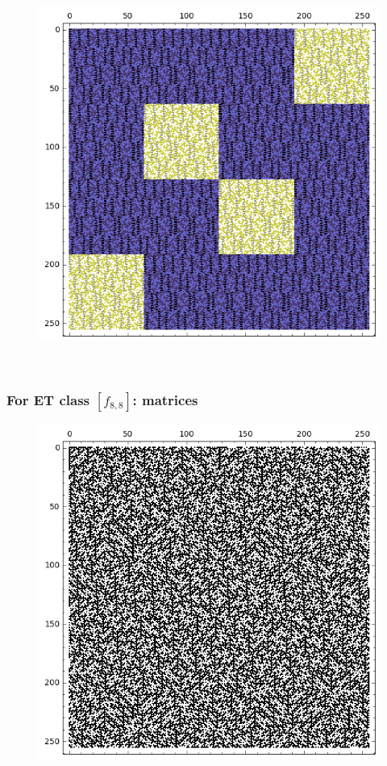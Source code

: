 \documentclass[pdf,sprung,slideColor,nocolorBG]{beamer}
\newenvironment{colortheme}[1]{
\def\ProvidesPackageRCS $##1${\relax}
\renewcommand{\ProcessOptions}{\relax}
\makeatletter

\makeatother
}{}
\begin{document}
\begin{colortheme}{jubata}
\begin{frame}
\begin{figure}
\begin{minipage}{.48\textwidth}
  \label{fig:8_7_weight_class_matrix}
\end{minipage}%
\begin{minipage}{.48\textwidth}
  \centering
  \includegraphics[width=.9\linewidth]{../matrix_plot/re8_7_bent_cayley_graph_index_matrix.png}
  \label{fig:8_7_bent_cayley_graph_index_matrix}
\end{minipage}
\end{figure}
~
\end{frame}
\begin{frame}
\frametitle{For ET class $[f_{8,8}]$: matrices}
\begin{figure}
\centering
\begin{minipage}{.48\textwidth}
  \centering
  \includegraphics[width=.9\linewidth]{../matrix_plot/re8_8_weight_class_matrix.png}

\end{minipage}
\end{figure}
\end{frame}
\end{colortheme}
\end{document}
